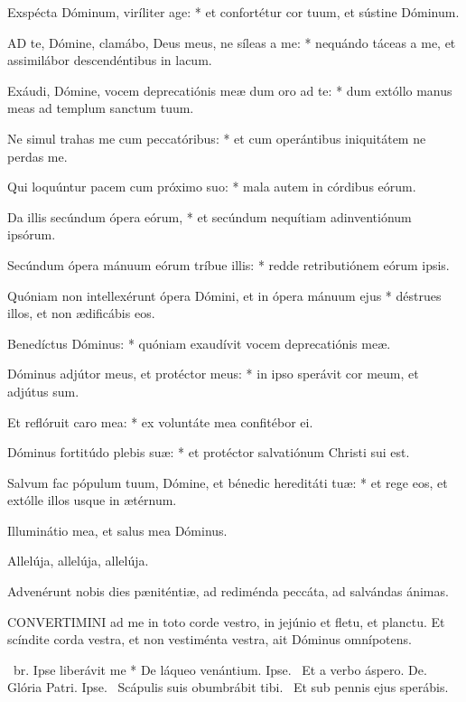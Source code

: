 Exspécta Dóminum, viríliter age: * et confortétur cor tuum, et sústine Dóminum.


\lettrine[lines=2]{A}{D} te, Dómine, clamábo, Deus meus, ne síleas a me: * nequándo táceas a me, et assimilábor descendéntibus in lacum.

Exáudi, Dómine, vocem deprecatiónis meæ dum oro ad te: * dum extóllo manus meas ad templum sanctum tuum.

Ne simul trahas me cum peccatóribus: * et cum operántibus iniquitátem ne perdas me.

Qui loquúntur pacem cum próximo suo: * mala autem in córdibus eórum.

Da illis secúndum ópera eórum, * et secúndum nequítiam adinventiónum ipsórum.

Secúndum ópera mánuum eórum tríbue illis: * redde retributiónem eórum ipsis.

Quóniam non intellexérunt ópera Dómini, et in ópera mánuum ejus * déstrues illos, et non ædificábis eos.

Benedíctus Dóminus: * quóniam exaudívit vocem deprecatiónis meæ.

Dóminus adjútor meus, et protéctor meus: * in ipso sperávit cor meum, et adjútus sum.

Et reflóruit caro mea: * ex voluntáte mea confitébor ei.

Dóminus fortitúdo plebis suæ: * et protéctor salvatiónum Christi sui est.

Salvum fac pópulum tuum, Dómine, et bénedic hereditáti tuæ: * et rege eos, et extólle illos usque in ætérnum.

  Illuminátio mea, et salus mea Dóminus.

  Allelúja, allelúja, allelúja.



 Advenérunt nobis dies pæniténtiæ, ad rediménda peccáta, ad salvándas ánimas.


\lettrine[lines=2]{C}{ONVERTIMINI} ad me in toto corde vestro, in jejúnio et fletu, et planctu. Et scíndite corda vestra, et non vestiménta vestra, ait Dóminus omnípotens.

\R\ br. Ipse liberávit me * De láqueo venántium. Ipse. \V\ Et a verbo áspero. De. Glória Patri. Ipse. \V\ Scápulis suis obumbrábit tibi. \R\ Et sub pennis ejus sperábis.

